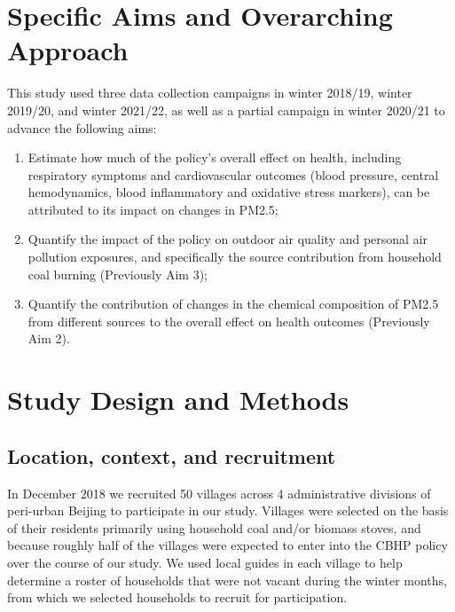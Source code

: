\documentclass[
  letterpaper,
  DIV=11,
  numbers=noendperiod]{scrartcl}
\begin{document}
\section{Specific Aims and Overarching
Approach}\label{specific-aims-and-overarching-approach}

This study used three data collection campaigns in winter 2018/19,
winter 2019/20, and winter 2021/22, as well as a partial campaign in
winter 2020/21 to advance the following aims:

\begin{enumerate}
\def\labelenumi{\arabic{enumi}.}
\item
  Estimate how much of the policy's overall effect on health, including
  respiratory symptoms and cardiovascular outcomes (blood pressure,
  central hemodynamics, blood inflammatory and oxidative stress
  markers), can be attributed to its impact on changes in PM2.5;
\item
  Quantify the impact of the policy on outdoor air quality and personal
  air pollution exposures, and specifically the source contribution from
  household coal burning (Previously Aim 3);
\item
  Quantify the contribution of changes in the chemical composition of
  PM2.5 from different sources to the overall effect on health outcomes
  (Previously Aim 2).
\end{enumerate}

\section{Study Design and Methods}\label{study-design-and-methods}

\subsection{Location, context, and
recruitment}\label{location-context-and-recruitment}

In December 2018 we recruited 50 villages across 4 administrative
divisions of peri-urban Beijing to participate in our study. Villages
were selected on the basis of their residents primarily using household
coal and/or biomass stoves, and because roughly half of the villages
were expected to enter into the CBHP policy over the course of our
study. We used local guides in each village to help determine a roster
of households that were not vacant during the winter months, from which
we selected households to recruit for participation.
\end{document}
